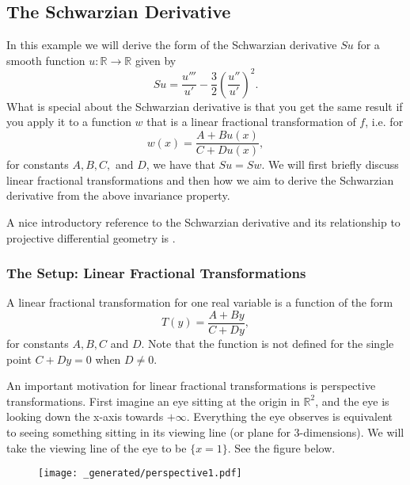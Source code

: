 \subsection{The Schwarzian Derivative}

In this example we will derive the form of the Schwarzian derivative \(Su\) for a smooth function \(u:\mathbb R \to \mathbb R\)
given by
\begin{equation}
Su = \frac{u'''}{u'} - \frac{3}{2}\left(\frac{u''}{u'}\right)^2.
\end{equation}
What is special about the Schwarzian derivative is that you get the same result if you apply it to
a function \(w\) that is a linear fractional transformation of \(f\), i.e. for
\begin{equation}
w(x) = \frac{A + Bu(x)}{C + Du(x)},
\end{equation}
for constants \(A, B, C,\) and \(D\), we have that \(Su = Sw\). We will first briefly discuss 
linear fractional transformations and then how we aim to derive the Schwarzian derivative from the
above invariance property.

A nice introductory reference to the Schwarzian derivative and its relationship to projective differential geometry
is \cite{schwarzian}.

\subsubsection*{The Setup: Linear Fractional Transformations}

A linear fractional transformation for one real variable is a function of the form
\begin{equation}
T(y) = \frac{A + By}{C + Dy},
\end{equation}
for constants \(A, B, C\) and \(D\). Note that the function is not defined for the single point \(C + Dy = 0\) when
\(D\neq 0\).

An important motivation for linear fractional transformations is perspective transformations. First imagine an
eye sitting at the origin in \(\mathbb R^2\), and the eye is looking down the x-axis towards \(+\infty\). 
Everything the eye
observes is equivalent to seeing something sitting in its viewing line (or plane for 3-dimensions). We will
take the viewing line of the eye to be \(\{x = 1\}\). See the figure below.

\begin{figure}[h]
\centering
\texttt{[image: \_generated/perspective1.pdf]}
\end{figure}

